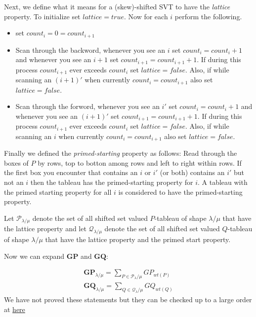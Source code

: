 \documentclass[]{amsart}
\theoremstyle{definition}
\begin{document}
Next, we define what it means for a (skew)-shifted SVT to have the \emph{lattice} property.  To initialize set $lattice=true$. Now for each $i$ perform the following. 
\begin{itemize}
\item set $count_i=0=count_{i+1}$
\item Scan through the backword, whenever you see an $i$ set $count_i=count_i+1$ and whenever you see an $i+1$ set $count_{i+1}=count_{i+1}+1$.  If during this process $count_{i+1}$ ever exceeds $count_i$ set $lattice=false$. Also, if while scanning an $(i+1)'$ when currently $count_i=count_{i+1}$ also set $lattice=false$.
\item Scan through the forword, whenever you see an $i'$ set $count_i=count_i+1$ and whenever you see an $(i+1)'$ set $count_{i+1}=count_{i+1}+1$.  If during this process $count_{i+1}$ ever exceeds $count_i$ set $lattice=false$. Also, if while scanning an $i$ when currently $count_i=count_{i+1}$ also set $lattice=false$.
\end{itemize}



Finally we defined the \emph{primed-starting} property as follows: Read through the boxes of $P$ by rows, top to botton among rows and left to right within rows.  If the first box you encounter that contains an $i$ or $i'$ (or both) contains an $i'$ but not an $i$ then the tableau has the primed-starting property for $i$. A tableau with the primed starting property for all $i$ is considered to have the primed-starting property.  

Let $\mathcal{P}_{\lambda/\mu}$ denote the set of all shifted set valued $P$-tableau of shape $\lambda/\mu$ that have the lattice property and let $\mathcal{Q}_{\lambda/\mu}$ denote the set of all shifted set valued $Q$-tableau of shape $\lambda/\mu$ that have the lattice property and the primed start property.

Now we can expand $\mathbf{GP}$ and $\mathbf{GQ}$:

\begin{eqnarray*}
\mathbf{GP}_{\lambda/\mu}=\sum_{P \in \mathcal{P_\lambda/\mu}} GP_{wt(P)}\\
\mathbf{GQ}_{\lambda/\mu}=\sum_{Q \in \mathcal{Q_\lambda/\mu}} GQ_{wt(Q)}
\end{eqnarray*}
We have not proved these statements but they can be checked up to a large order at \href{https://github.com/ghawkes1217/Conjectures-and-Computations}{here}
\end{document}
